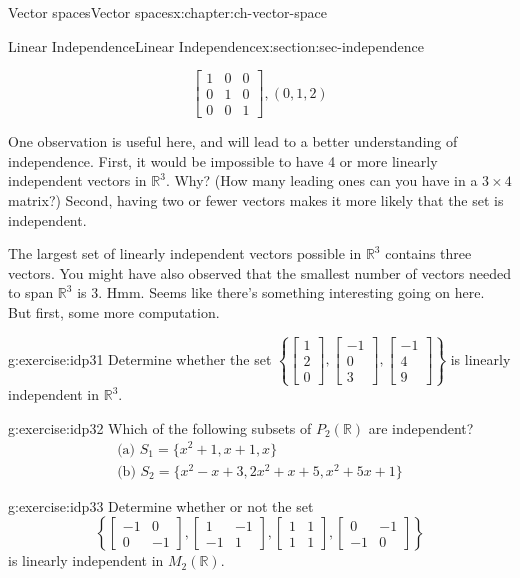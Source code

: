 \documentclass[oneside,10pt,]{book}
\numberwithin{equation}{section}
\newcommand{\bbm}{\begin{bmatrix}}
\newcommand{\ebm}{\end{bmatrix}}
\newcommand{\R}{\mathbb{R}}
\newcommand{\amp}{&}
\begin{document}
\begin{chapterptx}{Vector spaces}{}{Vector spaces}{}{}{x:chapter:ch-vector-space}
\begin{sectionptx}{Linear Independence}{}{Linear Independence}{}{}{x:section:sec-independence}
\begin{sageoutput}
\[\bbm 1\amp 0\amp 0\\0\amp 1\amp 0\\0\amp 0\amp 1\ebm, (0,1,2)\]
\end{sageoutput}
One observation is useful here, and will lead to a better understanding of independence. First, it would be impossible to have 4 or more linearly independent vectors in \(\mathbb{R}^3\). Why? (How many leading ones can you have in a \(3\times 4\) matrix?) Second, having two or fewer vectors makes it more likely that the set is independent.%
\par
The largest set of linearly independent vectors possible in \(\mathbb{R}^3\) contains three vectors. You might have also observed that the smallest number of vectors needed to span \(\mathbb{R}^3\) is 3. Hmm. Seems like there's something interesting going on here. But first, some more computation.%
\begin{inlineexercise}{}{g:exercise:idp31}%
Determine whether the set \(\left\{\bbm 1\\2\\0\ebm, \bbm -1\\0\\3\ebm,\bbm -1\\4\\9\ebm\right\}\) is linearly independent in \(\R^3\).%
\end{inlineexercise}%
\begin{inlineexercise}{}{g:exercise:idp32}%
Which of the following subsets of \(P_2(\mathbb{R})\) are independent?%
\begin{gather*}
\text{(a) } S_1 = \{x^2+1, x+1, x\}\\
\text{(b) } S_2 = \{x^2-x+3, 2x^2+x+5, x^2+5x+1\}
\end{gather*}
%
\end{inlineexercise}%
\begin{inlineexercise}{}{g:exercise:idp33}%
Determine whether or not the set%
\begin{equation*}
\left\{\bbm -1\amp 0\\0\amp -1\ebm, \bbm 1\amp -1\\ -1\amp 1\ebm,
\bbm 1\amp 1\\1\amp 1\ebm, \bbm 0\amp -1\\-1\amp 0\ebm\right\}
\end{equation*}
is linearly independent in \(M_2(\mathbb{R})\).%
\end{inlineexercise}%
\end{sectionptx}
%
%
\typeout{************************************************}

\end{chapterptx}
\end{document}
